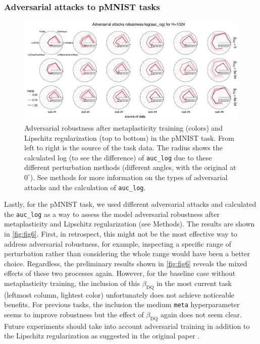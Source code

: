 \documentclass[manuscript,screen,review=false, nonacm]{acmart}
\begin{document}
\subsubsection{Adversarial attacks to pMNIST tasks}

\begin{figure}[ht]
    \centering
    \includegraphics[width=1.1\textwidth]{figures/report/Fig6.pdf}
    \caption{
    Adversarial robustness after metaplasticity training (colors) and Lipschitz regularization (top to bottom) in the pMNIST task. From left to right is the source of the task data. 
    The radius shows the calculated log (to see the difference) of \texttt{auc\_log} due to these different perturbation methods (different angles, with the original at $0^{\circ}$). 
    See methods for more information on the types of adversarial attacks and the calculation of \texttt{auc\_log}.
    }
    \label{fig:fig6}
\end{figure}

Lastly, for the pMNIST task, we used different adversarial attacks and calculated the \texttt{auc\_log} as a way to assess the model adversarial robustness after metaplasticity and Lipschitz regularization (see Methods). The results are shown in \autoref{fig:fig6}. First, in retrospect, this might not be the most effective way to address adversarial robustness, for example, inspecting a specific range of perturbation rather than considering the whole range would have been a better choice. Regardless, the preliminary results shown in \autoref{fig:fig6} reveals the mixed effects of these two processes again. However, for the baseline case without metaplasticity training, the inclusion of this $\beta_{\mathrm{DQ}}$ in the most current task (leftmost column, lightest color) unfortunately does not achieve noticeable benefits. For previous tasks, the inclusion the medium \texttt{meta} hyperparameter seems to improve robustness but the effect of $\beta_{\mathrm{DQ}}$ again does not seem clear. Future experiments should take into account adversarial training in addition to the Lipschitz regularization as suggested in the original paper \cite{Lin_2019}.
\end{document}
